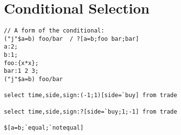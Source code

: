 \section{Conditional Selection}


\begin{verbatim}
// A form of the conditional:
("j"$a=b) foo/bar  / ?[a=b;foo bar;bar]
a:2;
b:1;
foo:{x*x};
bar:1 2 3;
("j"$a=b) foo/bar

select time,side,sign:(-1;1)[side=`buy] from trade

select time,side,sign:?[side=`buy;1;-1] from trade

$[a=b;`equal;`notequal]

\end{verbatim}


\clearpage
